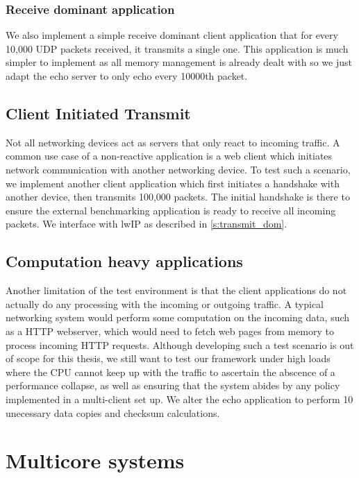 \subsubsection{Receive dominant application}
We also implement a simple receive dominant client application that for every 10,000 UDP packets received, it transmits a single one.
This application is much simpler to implement as all memory management is already dealt with so we just adapt the echo server to 
only echo every 10000th packet.\\

\subsection{Client Initiated Transmit}
Not all networking devices act as servers that only react to incoming traffic. A common use case of a non-reactive application is a 
web client which initiates network communication with another networking device. To test such a scenario, we implement another client
application which first initiates a handshake with another device, then transmits 100,000 packets. The initial handshake is there to 
ensure the external benchmarking application is ready to receive all incoming packets. We interface with lwIP as described
in \ref{s:transmit_dom}.

\subsection{Computation heavy applications}
Another limitation of the test environment is that the client applications do not actually do any processing with the incoming or outgoing traffic.
A typical networking system would perform some computation on the incoming data, such as a HTTP webserver, which would need to fetch web pages from
memory to process incoming HTTP requests. Although developing such a test scenario is out of scope for this thesis, we still want to test
our framework under high loads where the CPU cannot keep up with the traffic to ascertain the abscence of a performance collapse, as well as
ensuring that the system abides by any policy implemented in a multi-client set up. We alter the echo application to perform 10 unecessary data copies
and checksum calculations.

\section{Multicore systems}

